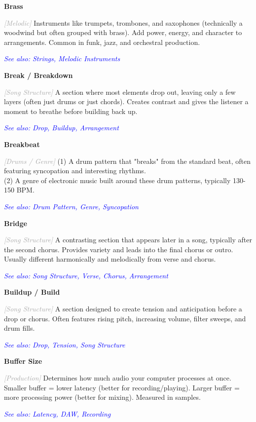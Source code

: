 \documentclass[11pt,letterpaper]{article}
\newcommand{\term}[1]{\textbf{\large\color{purple}#1}}
\newcommand{\category}[1]{\textcolor{darkgray}{\textit{\small [#1]}}}
\newcommand{\seealso}[1]{\textcolor{blue}{\textit{See also: #1}}}
\newenvironment{termdef}[1]
  {\noindent\term{#1}\par\nopagebreak}
  {\par\vspace{0.3em}}
\begin{document}
\begin{termdef}{Brass}
\category{Melodic}
Instruments like trumpets, trombones, and saxophones (technically a woodwind but often grouped with brass). Add power, energy, and character to arrangements. Common in funk, jazz, and orchestral production.

\seealso{Strings, Melodic Instruments}
\end{termdef}

\begin{termdef}{Break / Breakdown}
\category{Song Structure}
A section where most elements drop out, leaving only a few layers (often just drums or just chords). Creates contrast and gives the listener a moment to breathe before building back up.

\seealso{Drop, Buildup, Arrangement}
\end{termdef}

\begin{termdef}{Breakbeat}
\category{Drums / Genre}
(1) A drum pattern that "breaks" from the standard beat, often featuring syncopation and interesting rhythms. \\
(2) A genre of electronic music built around these drum patterns, typically 130-150 BPM.

\seealso{Drum Pattern, Genre, Syncopation}
\end{termdef}

\begin{termdef}{Bridge}
\category{Song Structure}
A contrasting section that appears later in a song, typically after the second chorus. Provides variety and leads into the final chorus or outro. Usually different harmonically and melodically from verse and chorus.

\seealso{Song Structure, Verse, Chorus, Arrangement}
\end{termdef}

\begin{termdef}{Buildup / Build}
\category{Song Structure}
A section designed to create tension and anticipation before a drop or chorus. Often features rising pitch, increasing volume, filter sweeps, and drum fills.

\seealso{Drop, Tension, Song Structure}
\end{termdef}

\begin{termdef}{Buffer Size}
\category{Production}
Determines how much audio your computer processes at once. Smaller buffer = lower latency (better for recording/playing). Larger buffer = more processing power (better for mixing). Measured in samples.

\seealso{Latency, DAW, Recording}
\end{termdef}
\end{document}
